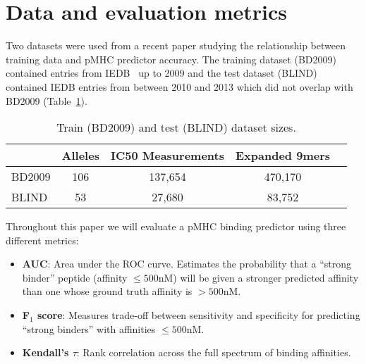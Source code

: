 \section{Data and evaluation metrics}

Two datasets were used from a recent paper studying the relationship between training data and pMHC predictor accuracy\cite{Kim_2014}. The training dataset (BD2009) contained entries from IEDB~\cite{Salimi_2012} up to 2009 and the test dataset (BLIND) contained IEDB entries from between 2010 and 2013 which did not overlap with BD2009 (Table~\ref{tab:datasets}).

\begin{table}[h!]
\centering
\begin{tabular}{l||cccc}
\toprule
{} & Alleles &  IC50 Measurements & Expanded 9mers \\
\midrule
BD2009 &     106 &                           137,654 &        470,170 \\
BLIND  &      53 &                           27,680 &         83,752 \\
\bottomrule
\end{tabular}
\caption{Train (BD2009) and test (BLIND) dataset sizes.}
\label{tab:datasets}
\end{table}

Throughout this paper we will evaluate a pMHC binding predictor using three different metrics:

\begin{itemize}
\item {\bf AUC}: Area under the ROC curve. Estimates the probability that a ``strong binder'' peptide (affinity $\leq 500$nM) will be given a stronger predicted affinity than one whose ground truth affinity is $>500$nM.
\item {\bf F$_1$ score}: Measures trade-off between sensitivity and specificity for predicting ``strong binders'' with affinities $\leq 500$nM. 
\item {\bf Kendall's $\tau$}: Rank correlation across the full spectrum of binding affinities.
\end{itemize}


